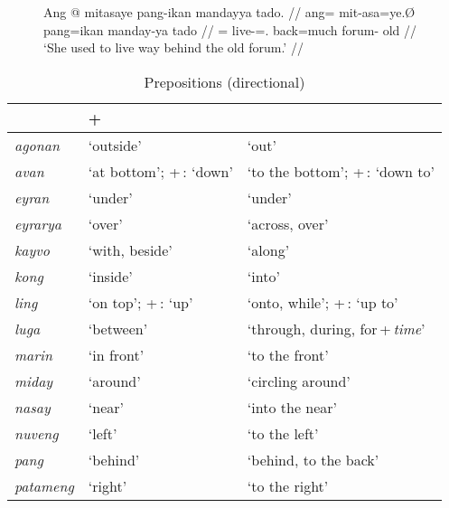 \begin{figure}[h]
\ex\label{ex:prepquant}\begingl
	\gla Ang @ mitasaye pang-ikan mandayya tado. //
	\glb ang= mit-asa=ye.Ø pang=ikan manday-ya tado //
	\glc \AgtT{}= live-\Hab{}=\TsgF{}.\Top{} back=much forum-\Loc{} old //
	\glft `She used to live way behind the old forum.' //
\endgl\xe
\end{figure}

\begin{table}\centering
\caption{Prepositions (directional)}
\begin{tabu} to 
\tableheaderfont\toprule
{}
	&  + \Prep{}
	\\

\toprule

agonan
	& `outside'
	& `out'
	\\

avan
	& `at bottom'; +\,\Dat{}: `down'
	& `to the bottom'; +\,\Dat{}: `down to'
	\\


eyran
	& `under'
	& `under'
	\\

eyrarya
	& `over'
	& `across, over'
	\\

kayvo
	& `with, beside'
	& `along'
	\\

kong
	& `inside'
	& `into'
	\\

ling
	& `on top'; +\,\Dat{}: `up'
	& `onto, while'; +\,\Dat{}: `up to'
	\\

luga
	& `between'
	& `through, during, for\,+\,\textit{time}'
	\\

marin
	& `in front'
	& `to the front'
	\\

miday
	& `around'
	& `circling around'
	\\

nasay
	& `near'
	& `into the near'
	\\

nuveng
	& `left'
	& `to the left'
	\\

pang
	& `behind'
	& `behind, to the back'
	\\

patameng
	& `right'
	& `to the right'
	\\

\bottomrule
\end{tabu}

\label{tab:preposdyn}
\end{table}

